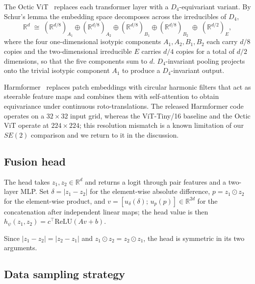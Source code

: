 \documentclass{article}
\begin{document}
The Octic ViT~\citep{nordstrom2025octic} replaces each transformer layer with a $D_4$-equivariant variant. By Schur's lemma the embedding space decomposes across the irreducibles of $D_4$,
\begin{equation}\label{eq:octic-decomp}
  \mathbb{R}^d \;\cong\;
  (\mathbb{R}^{d/8})_{A_1}\oplus(\mathbb{R}^{d/8})_{A_2}\oplus(\mathbb{R}^{d/8})_{B_1}\oplus(\mathbb{R}^{d/8})_{B_2}
  \;\oplus\;(\mathbb{R}^{d/2})_{E},
\end{equation}
where the four one-dimensional isotypic components $A_1,A_2,B_1,B_2$ each carry $d/8$ copies and the two-dimensional irreducible $E$ carries $d/4$ copies for a total of $d/2$ dimensions, so that the five components sum to $d$. $D_4$-invariant pooling projects onto the trivial isotypic component $A_1$ to produce a $D_4$-invariant output.

Harmformer~\citep{karella2024harmformer} replaces patch embeddings with circular harmonic filters that act as steerable feature maps and combines them with self-attention to obtain equivariance under continuous roto-translations. The released Harmformer code operates on a $32\times 32$ input grid, whereas the ViT-Tiny/16 baseline and the Octic ViT operate at $224\times 224$; this resolution mismatch is a known limitation of our $SE(2)$ comparison and we return to it in the discussion.

\subsection{Fusion head}

The head takes $z_1, z_2 \in \mathbb{R}^d$ and returns a logit through pair features and a two-layer MLP. Set $\delta = |z_1 - z_2|$ for the element-wise absolute difference, $p = z_1\odot z_2$ for the element-wise product, and $v = [u_\delta(\delta);\, u_p(p)]\in\mathbb{R}^{2d}$ for the concatenation after independent linear maps; the head value is then $h_\psi(z_1, z_2) = c^\top \mathrm{ReLU}(A v + b)$. 

Since $|z_1 - z_2| = |z_2 - z_1|$ and $z_1\odot z_2 = z_2\odot z_1$, the head is symmetric in its two arguments.

\subsection{Data sampling strategy}\label{sec:data-sampling}
\end{document}
